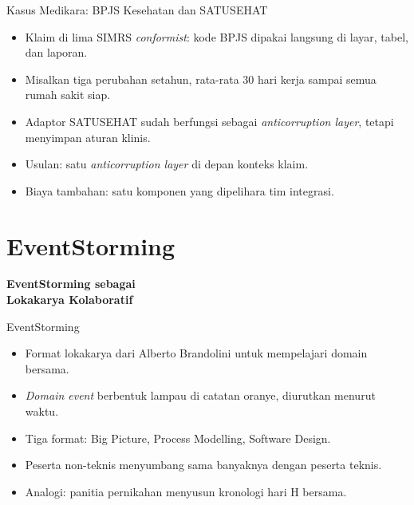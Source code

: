 \documentclass[aspectratio=169, table, 12pt]{beamer}
\begin{document}
\begin{frame}{{\Large Kasus Medikara: BPJS Kesehatan dan SATUSEHAT}}
  \vspace{10pt}
  \begin{itemize}
    \item Klaim di lima SIMRS \textit{conformist}: kode BPJS dipakai langsung di
          layar, tabel, dan laporan.
    \item Misalkan tiga perubahan setahun, rata-rata 30 hari kerja sampai semua
          rumah sakit siap.
    \item Adaptor SATUSEHAT sudah berfungsi sebagai \textit{anticorruption layer},
          tetapi menyimpan aturan klinis.
    \item Usulan: satu \textit{anticorruption layer} di depan konteks klaim.
    \item Biaya tambahan: satu komponen yang dipelihara tim integrasi.
  \end{itemize}
\end{frame}

\section{EventStorming}

\begin{frame}{\hfill}
  \centering
  \Huge{\textbf{EventStorming sebagai\\Lokakarya Kolaboratif}}
\end{frame}

\begin{frame}{{\Large EventStorming}}
  \vspace{10pt}
  \begin{itemize}
    \item Format lokakarya dari Alberto Brandolini untuk mempelajari domain
          bersama.
    \item \textit{Domain event} berbentuk lampau di catatan oranye, diurutkan
          menurut waktu.
    \item Tiga format: Big Picture, Process Modelling, Software Design.
    \item Peserta non-teknis menyumbang sama banyaknya dengan peserta teknis.
    \item Analogi: panitia pernikahan menyusun kronologi hari H bersama.
  \end{itemize}
\end{frame}
\end{document}

